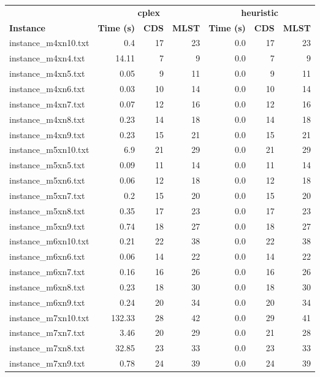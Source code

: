 \documentclass{article}
\begin{document}
\begin{center}
\renewcommand{\arraystretch}{1.4}
 \begin{tabular}{lrrrrrr}
	\hline
 & \multicolumn{3}{c}{\textbf{cplex}} & \multicolumn{3}{c}{\textbf{heuristic}}\\
\textbf{Instance}  & \textbf{Time (s)} & \textbf{CDS} & \textbf{MLST}   & \textbf{Time (s)} & \textbf{CDS} & \textbf{MLST}  \\\hline

instance\_m4xn10.txt & 0.4 & 17 & 23
 & 0.0 & 17 & 23
\\
instance\_m4xn4.txt & 14.11 & 7 & 9
 & 0.0 & 7 & 9
\\
instance\_m4xn5.txt & 0.05 & 9 & 11
 & 0.0 & 9 & 11
\\
instance\_m4xn6.txt & 0.03 & 10 & 14
 & 0.0 & 10 & 14
\\
instance\_m4xn7.txt & 0.07 & 12 & 16
 & 0.0 & 12 & 16
\\
instance\_m4xn8.txt & 0.23 & 14 & 18
 & 0.0 & 14 & 18
\\
instance\_m4xn9.txt & 0.23 & 15 & 21
 & 0.0 & 15 & 21
\\
instance\_m5xn10.txt & 6.9 & 21 & 29
 & 0.0 & 21 & 29
\\
instance\_m5xn5.txt & 0.09 & 11 & 14
 & 0.0 & 11 & 14
\\
instance\_m5xn6.txt & 0.06 & 12 & 18
 & 0.0 & 12 & 18
\\
instance\_m5xn7.txt & 0.2 & 15 & 20
 & 0.0 & 15 & 20
\\
instance\_m5xn8.txt & 0.35 & 17 & 23
 & 0.0 & 17 & 23
\\
instance\_m5xn9.txt & 0.74 & 18 & 27
 & 0.0 & 18 & 27
\\
instance\_m6xn10.txt & 0.21 & 22 & 38
 & 0.0 & 22 & 38
\\
instance\_m6xn6.txt & 0.06 & 14 & 22
 & 0.0 & 14 & 22
\\
instance\_m6xn7.txt & 0.16 & 16 & 26
 & 0.0 & 16 & 26
\\
instance\_m6xn8.txt & 0.23 & 18 & 30
 & 0.0 & 18 & 30
\\
instance\_m6xn9.txt & 0.24 & 20 & 34
 & 0.0 & 20 & 34
\\
instance\_m7xn10.txt & 132.33 & 28 & 42
 & 0.0 & 29 & 41
\\
instance\_m7xn7.txt & 3.46 & 20 & 29
 & 0.0 & 21 & 28
\\
instance\_m7xn8.txt & 32.85 & 23 & 33
 & 0.0 & 23 & 33
\\
instance\_m7xn9.txt & 0.78 & 24 & 39
 & 0.0 & 24 & 39
\\

\end{tabular}
\end{center}
\end{document}
